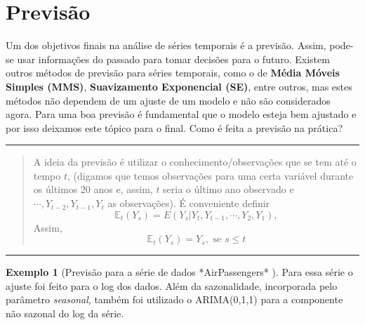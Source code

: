 \documentclass[
]{book}
\theoremstyle{definition}
\theoremstyle{definition}
\newtheorem{example}{Exemplo}[chapter]
\theoremstyle{definition}
\theoremstyle{remark}
\begin{document}
\pagebreak

\hypertarget{previsuxe3o}{%
\section{Previsão}\label{previsuxe3o}}

Um dos objetivos finais na análise de séries temporais é a previsão. Assim, pode-se usar informações do passado para tomar decisões para o futuro. Existem outros métodos de previsão para séries temporais, como o de \textbf{Média Móveis Simples (MMS)}, \textbf{Suavizamento Exponencial (SE)}, entre outros, mas estes métodos não dependem de um ajuste de um modelo e não são considerados agora. Para uma boa previsão é fundamental que o modelo esteja bem ajustado e por isso deixamos este tópico para o final. Como é feita a previsão na prática?

\begin{center}\rule{0.5\linewidth}{0.5pt}\end{center}

\begin{quote}
A ideia da previsão é utilizar o conhecimento/observações que se tem até o tempo \(t\),
(digamos que temos observações para uma certa variável durante os últimos 20 anos e, assim, \(t\) seria o último ano observado
e \(\cdots,Y_{t-2},Y_{t-1},Y_t\) as observações).
É conveniente definir
\[
\mathbb{E}_t(Y_s)=E(Y_s|Y_t,Y_{t-1},\cdots,Y_2,Y_1),
\]
Assim,
\[\mathbb{E}_t(Y_s)=Y_s, \mbox{ se $s\leq t$}\]
\end{quote}

\begin{center}\rule{0.5\linewidth}{0.5pt}\end{center}

\begin{example}[Previsão para a série de dados *AirPassengers* ]
\protect\hypertarget{exm:airpass}{}{\label{exm:airpass} {} }Para essa série o ajuste foi feito para o log dos dados. Além da sazonalidade, incorporada pelo parâmetro \emph{seasonal}, também foi utilizado o ARIMA(0,1,1) para a componente não sazonal do log da série.
\end{example}
\end{document}
